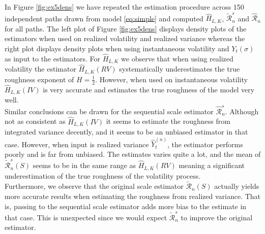 \documentclass{article}
\begin{document}
In Figure \ref{fig:ex5dens} we have repeated the estimation procedure across 150 independent paths drawn from model \eqref{eq:simple} and computed $\widehat{H}_{L,K}$, $\widetilde{\mathscr{R}}_n^s$ and $\widehat{\mathscr{R}}_n$ for all paths. The left plot of Figure \ref{fig:ex5dens} displays density plots of the estimators when used on realized volatility and realized variance whereas the right plot displays density plots when using instantaneous volatility and $Y_t(\sigma)$ as input to the estimators. For $\widehat{H}_{L,K}$ we observe that when using realized volatility the estimator $\widehat{H}_{L,K}(RV)$ systematically underestimates the true roughness exponent of $H=\frac{1}{2}$. However, when used on instantaneous volatility $\widehat{H}_{L,K}(IV)$ is very accurate and estimates the true roughness of the model very well. \\
Similar conclusions can be drawn for the sequential scale estimator $\widehat{\mathscr{R}}_n^s$. Although not as consistent as $\widehat{H}_{L,K}(IV)$ it seems to estimate the roughness from integrated variance decently, and it seems to be an unbiased estimator in that case. However, when input is realized variance $\widehat{Y}_t^{(n)}$, the estimator performs poorly and is far from unbiased. The estimates varies quite a lot, and the mean of $\widetilde{\mathscr{R}}_n^s(S)$ seems to be in the same range as $\widehat{H}_{L,K}(RV)$ meaning a significant underestimation of the true roughness of the volatility process.\\
Furthermore, we observe that the original scale estimator $\widetilde{\mathscr{R}}_n(S)$ actually yields more accurate results when estimating the roughness from realized variance. That is, passing to the sequential scale estimator adds more bias to the estimate in that case. This is unexpected since we would expect $\widetilde{\mathscr{R}}_n^s$ to improve the original estimator.
\end{document}

